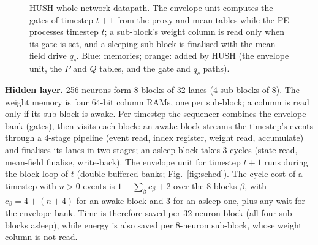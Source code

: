 \documentclass[conference]{IEEEtran}
\begin{document}
\begin{figure}[t]
\caption{HUSH whole-network datapath. The envelope unit computes the gates of timestep $t{+}1$ from the proxy and mean
tables while the PE processes timestep $t$; a sub-block's weight column is read only when its gate is set, and a
sleeping sub-block is finalised with the mean-field drive $q_c$. Blue: memories; orange: added by HUSH (the
envelope unit, the $P$ and $Q$ tables, and the gate and $q_c$ paths).}\label{fig:arch}\end{figure}

\textbf{Hidden layer.} 256 neurons form 8 blocks of 32 lanes (4 sub-blocks of 8). The weight memory is four 64-bit
column RAMs, one per sub-block; a column is read only if its sub-block is awake. Per timestep the sequencer combines
the envelope bank (gates), then visits each block: an awake block streams the timestep's events through a
4-stage pipeline (event read, index register, weight read, accumulate) and finalises its lanes in two stages; an
asleep block takes 3 cycles (state read, mean-field finalise, write-back). The envelope unit for timestep $t+1$
runs during the block loop of $t$ (double-buffered banks; Fig.~\ref{fig:sched}). The cycle cost of a timestep with $n>0$ events is
$1 + \sum_{\beta} c_{\beta} + 2$ over the 8 blocks $\beta$, with $c_{\beta} = 4 + (n+4)$ for an awake block and 3 for an asleep one, plus any wait for the
envelope bank. Time is therefore saved per 32-neuron block (all four sub-blocks asleep), while energy is also saved per
8-neuron sub-block, whose weight column is not read.
\end{document}
